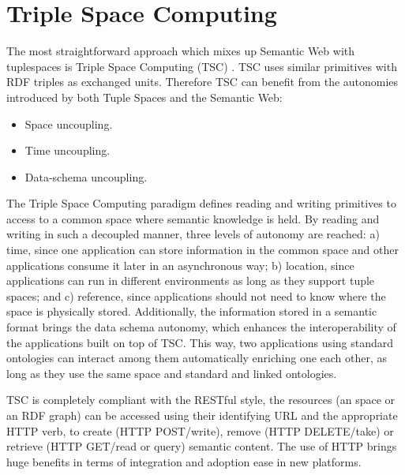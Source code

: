 \section{Triple Space Computing}
\label{sec:tsc_soa}




The most straightforward approach which mixes up Semantic Web with tuplespaces is Triple Space Computing (TSC) \cite{fensel_triple-space_2004}.
TSC uses similar primitives with RDF triples as exchanged units.
Therefore TSC can benefit from the autonomies introduced by both Tuple Spaces and the Semantic Web:

\begin{itemize}
  \item Space uncoupling.
  \item Time uncoupling.
  \item Data-schema uncoupling.
\end{itemize}




The Triple Space Computing paradigm defines reading and writing primitives to access to a common space where semantic
knowledge is held. By reading and writing in such a decoupled manner, three levels of autonomy are reached: a) time,
since one application can store information in the common space and other applications consume it later in an
asynchronous way; b) location, since applications can run in different environments as long as they support tuple
spaces; and c) reference, since applications should not need to know where the space is physically stored. Additionally,
the information stored in a semantic format brings the data schema autonomy, which enhances the interoperability of the
applications built on top of TSC. This way, two applications using standard ontologies can interact among them
automatically enriching one each other, as long as they use the same space and standard and linked ontologies.

TSC is completely compliant with the RESTful style, the resources (an space or an RDF graph) can be accessed using their
identifying URL and the appropriate HTTP verb, to create (HTTP POST/write), remove (HTTP DELETE/take) or retrieve (HTTP
GET/read or query) semantic content. The use of HTTP brings huge benefits in terms of integration and adoption ease in
new platforms.

